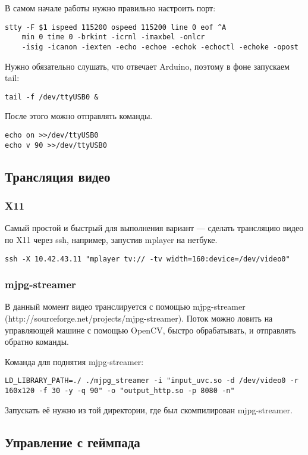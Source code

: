 \documentclass[a4paper]{article}
\begin{document}
В самом начале работы нужно правильно настроить порт:
\begin{verbatim}
stty -F $1 ispeed 115200 ospeed 115200 line 0 eof ^A 
    min 0 time 0 -brkint -icrnl -imaxbel -onlcr 
    -isig -icanon -iexten -echo -echoe -echok -echoctl -echoke -opost
\end{verbatim}

Нужно обязательно слушать, что отвечает Arduino, поэтому в фоне запускаем tail:
\begin{verbatim}
tail -f /dev/ttyUSB0 &
\end{verbatim}

После этого можно отправлять команды.
\begin{verbatim}
echo on >>/dev/ttyUSB0
echo v 90 >>/dev/ttyUSB0
\end{verbatim}

\subsection{Трансляция видео}

\subsubsection{X11}
Самый простой и быстрый для выполнения вариант --- сделать трансляцию видео по X11 через ssh, например, запустив mplayer на нетбуке.

\begin{verbatim}
ssh -X 10.42.43.11 "mplayer tv:// -tv width=160:device=/dev/video0"
\end{verbatim}

\subsubsection{mjpg-streamer}
В данный момент видео транслируется с помощью mjpg-streamer (http://sourceforge.net/projects/mjpg-streamer). Поток можно ловить на управляющей машине с помощью OpenCV, быстро обрабатывать, и отправлять обратно команды.

Команда для поднятия mjpg-streamer:

\begin{verbatim}
LD_LIBRARY_PATH=./ ./mjpg_streamer -i "input_uvc.so -d /dev/video0 -r 160x120 -f 30 -y -q 90" -o "output_http.so -p 8080 -n"
\end{verbatim}

Запускать её нужно из той директории, где был скомпилирован mjpg-streamer.
\subsection{Управление с геймпада}
\end{document}
